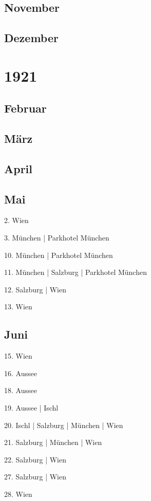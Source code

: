 \documentclass[twoside=false,titlepage=false,open=any, parskip=never, fontsize=10pt, headings=small, chapterprefix=false, appendixprefix=false, DIV=15]{scrbook}
\begin{document}
\begin{multicols}{3}
            \section*{November}
            \section*{Dezember}
            \chapter*{1921}
            \section*{Februar}
            \section*{März}
            \section*{April}
            \section*{Mai}
            2. Wien\par
            3. München | Parkhotel München\par
            10. München | Parkhotel München\par
            11. München | Salzburg | Parkhotel München\par
            12. Salzburg | Wien\par
            13. Wien\par
            \section*{Juni}
            15. Wien\par
            16. Aussee\par
            18. Aussee\par
            19. Aussee | Ischl\par
            20. Ischl | Salzburg | München | Wien\par
            21. Salzburg | München | Wien\par
            22. Salzburg | Wien\par
            27. Salzburg | Wien\par
            28. Wien\par

\end{multicols}
\end{document}
